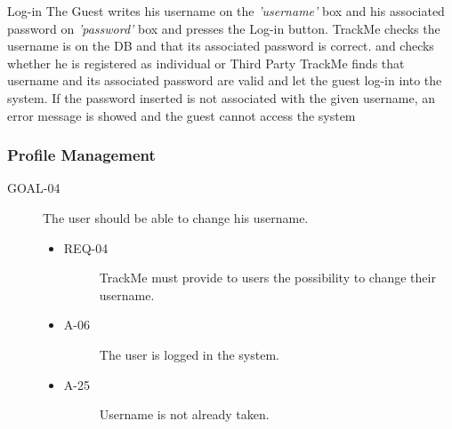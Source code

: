 \documentclass[a4paper]{article}
\newcommand{\requirement}{\ding{229}}%
\begin{document}
        
        \begin{usecase}{Log-in}
              {The Guest writes his username on the \textit{'username'} box and his associated password on \textit{'password'} box and presses the Log-in button.}
              {TrackMe checks the username is on the DB and that its associated password is correct. and checks whether he is  registered as individual or Third Party}
              {TrackMe finds that username and its associated password are valid and let the guest log-in into the system.}
        {If the password inserted is not associated with the given username, an error message is showed and the guest cannot access the system}
        \end{usecase}
        
        
        \subsubsection{Profile Management }
        
        \begin{description}
        	\item[GOAL-04] The user should be able to change his username.
            	\begin{itemize}
            	    \item[\requirement]
                	\begin{description}
                	\item[REQ-04] TrackMe must provide to users the possibility to change their username. 
                	\end{description}
                	\item
                	\begin{description}
                	\item[A-06] The user is logged in the system.
                	\end{description}
                	\item
                	\begin{description}
                	\item[A-25] Username is not already taken.
                	\end{description}
                	\end{itemize}
        \end{description}
        
\end{document}
